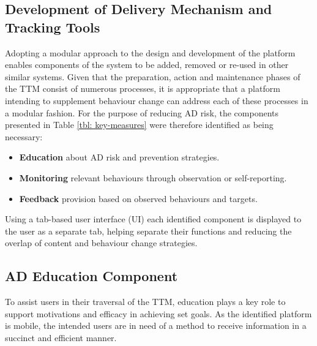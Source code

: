 \subsection{Development of Delivery Mechanism and Tracking Tools}
Adopting a modular approach to the design and development of the platform enables components of the system to be added, removed or re-used in other similar systems. Given that the preparation, action and maintenance phases of the TTM consist of numerous processes, it is appropriate that a platform intending to supplement behaviour change can address each of these processes in a modular fashion. For the purpose of reducing AD risk, the components presented in Table \ref{tbl: key-measures} were therefore identified as being necessary:
\begin{itemize}
\item \textbf{Education} about AD risk and prevention strategies.
\item \textbf{Monitoring} relevant behaviours through observation or self-reporting.
\item \textbf{Feedback} provision based on observed behaviours and targets.
\end{itemize}

Using a tab-based user interface (UI) each identified component is displayed to the user as a separate tab, helping separate their functions and reducing the overlap of content and behaviour change strategies.

\subsection{AD Education Component}
To assist users in their traversal of the TTM, education plays a key role to support motivations and efficacy in achieving set goals. As the identified platform is mobile, the intended users are in need of a method to receive information in a succinct and efficient manner.

